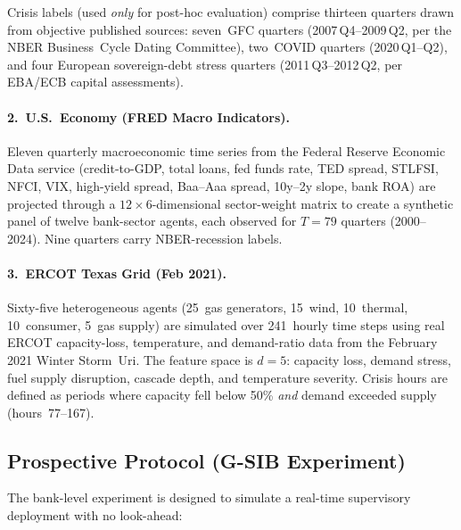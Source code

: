 Crisis labels (used \emph{only} for post-hoc evaluation) comprise
thirteen quarters drawn from objective published sources: seven~GFC
quarters (2007\,Q4--2009\,Q2, per the NBER Business~Cycle Dating
Committee), two~COVID quarters (2020\,Q1--Q2), and four European
sovereign-debt stress quarters (2011\,Q3--2012\,Q2, per EBA/ECB
capital assessments).

\paragraph{2.\ U.S.\ Economy (FRED Macro Indicators).}
Eleven quarterly macroeconomic time series from the Federal Reserve
Economic Data service (credit-to-GDP, total loans, fed funds rate,
TED spread, STLFSI, NFCI, VIX, high-yield spread, Baa--Aaa spread,
10y--2y slope, bank ROA) are projected through a
$12{\times}6$-dimensional sector-weight matrix to create a synthetic
panel of twelve bank-sector agents, each observed for $T{=}79$
quarters (2000--2024).  Nine quarters carry NBER-recession labels.

\paragraph{3.\ ERCOT Texas Grid (Feb 2021).}
Sixty-five heterogeneous agents (25~gas generators, 15~wind, 10~thermal,
10~consumer, 5~gas supply) are simulated over 241~hourly time steps
using real ERCOT capacity-loss, temperature, and demand-ratio data
from the February 2021 Winter Storm~Uri.  The feature space is
$d{=}5$: capacity loss, demand stress, fuel supply disruption,
cascade depth, and temperature severity.  Crisis hours are defined as
periods where capacity fell below 50\% \emph{and} demand exceeded
supply (hours~77--167).

\subsection{Prospective Protocol (G-SIB Experiment)}
\label{sec:prospective_protocol}

The bank-level experiment is designed to simulate a real-time
supervisory deployment with no look-ahead:

